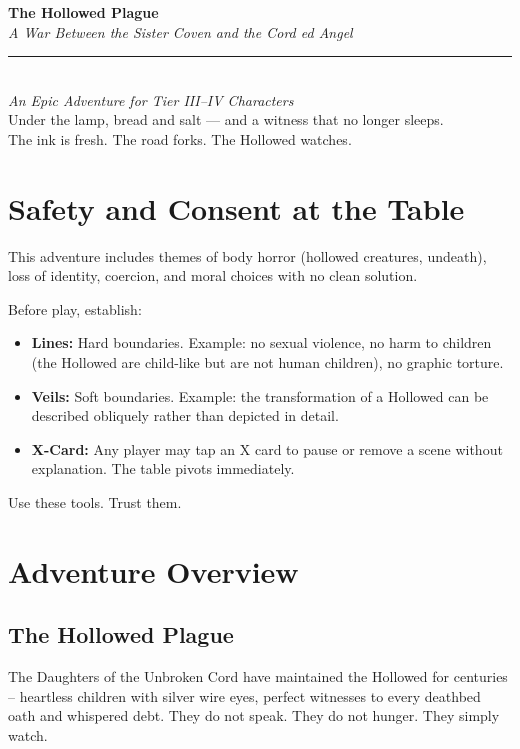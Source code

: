 \documentclass[10pt,twoside]{book}
\begin{document}
\titlepage
\begin{center}
\vspace*{2cm}
{\huge\bfseries\color{threadRed} The Hollowed Plague}\\[0.8cm]
{\Large\itshape A War Between the Sister Coven and the Cord ed Angel}\\[1.5cm]
\rule{0.6\textwidth}{1pt}\\[0.5cm]
\emph{An Epic Adventure for Tier III--IV Characters}\\[1cm]
\vfill
{\small \textcolor{chainGrey}{Under the lamp, bread and salt --- and a witness that no longer sleeps.}}\\[0.2cm]
{\small \textcolor{chainGrey}{The ink is fresh. The road forks. The Hollowed watches.}}
\end{center}
\newpage

\chapter*{Safety and Consent at the Table}
This adventure includes themes of body horror (hollowed creatures, undeath), loss of identity, coercion, and moral choices with no clean solution.

Before play, establish:
\begin{itemize}
\item \textbf{Lines:} Hard boundaries. Example: no sexual violence, no harm to children (the Hollowed are child-like but are not human children), no graphic torture.
\item \textbf{Veils:} Soft boundaries. Example: the transformation of a Hollowed can be described obliquely rather than depicted in detail.
\item \textbf{X-Card:} Any player may tap an X card to pause or remove a scene without explanation. The table pivots immediately.
\end{itemize}
Use these tools. Trust them.

\tableofcontents
\newpage


\chapter{Adventure Overview}

\section{The Hollowed Plague}
The Daughters of the Unbroken Cord have maintained the Hollowed for centuries -- heartless children with silver wire eyes, perfect witnesses to every deathbed oath and whispered debt. They do not speak. They do not hunger. They simply watch.
\end{document}
